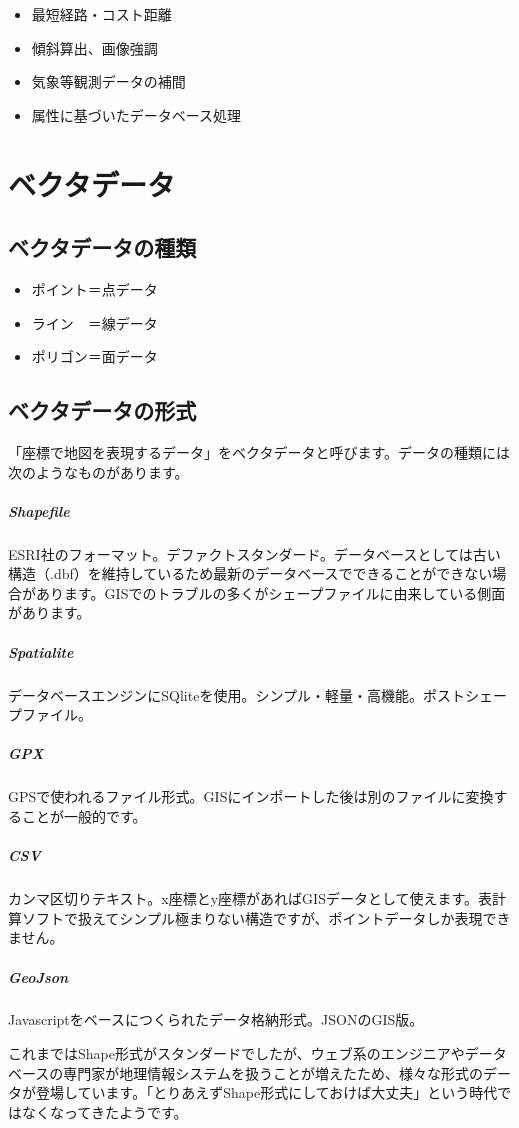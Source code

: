 \documentclass[14Q,twocolumn]{jsarticle}
\begin{document}
\begin{itemize}
\item 最短経路・コスト距離
\item 傾斜算出、画像強調
\item 気象等観測データの補間
\item 属性に基づいたデータベース処理
\end{itemize}

\section{ベクタデータ}
\subsection{ベクタデータの種類}
\begin{itemize}
\item ポイント＝点データ
\item ライン　＝線データ
\item ポリゴン＝面データ
\end{itemize}

\subsection{ベクタデータの形式}
「座標で地図を表現するデータ」をベクタデータと呼びます。データの種類には次のようなものがあります。

\subparagraph{Shapefile}
ESRI社のフォーマット。デファクトスタンダード。データベースとしては古い構造（.dbf）を維持しているため最新のデータベースでできることができない場合があります。GISでのトラブルの多くがシェープファイルに由来している側面があります。
\subparagraph{Spatialite}
データベースエンジンにSQliteを使用。シンプル・軽量・高機能。ポストシェープファイル。
\subparagraph{GPX}
GPSで使われるファイル形式。GISにインポートした後は別のファイルに変換することが一般的です。
\subparagraph{CSV}
カンマ区切りテキスト。x座標とy座標があればGISデータとして使えます。表計算ソフトで扱えてシンプル極まりない構造ですが、ポイントデータしか表現できません。
\subparagraph{GeoJson}
Javascriptをベースにつくられたデータ格納形式。JSONのGIS版。

これまではShape形式がスタンダードでしたが、ウェブ系のエンジニアやデータベースの専門家が地理情報システムを扱うことが増えたため、様々な形式のデータが登場しています。「とりあえずShape形式にしておけば大丈夫」という時代ではなくなってきたようです。
\end{document}
